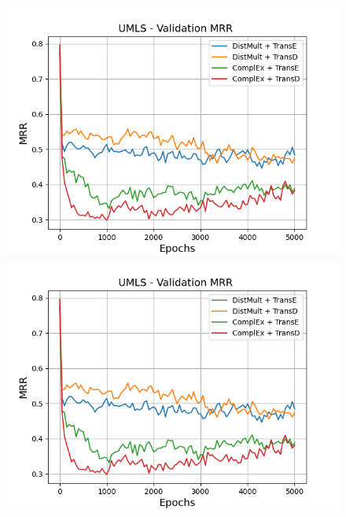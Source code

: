 \begin{figure}
    \centering
    \begin{minipage}{.5\textwidth}
      \centering
      \includegraphics[width=\linewidth]{figures/results/gan_train/pretrained/uncertainty/max/entropy/umls/5k_epochs/uncertainty_umls_mrrs.png}
    \end{minipage}%
    \begin{minipage}{.5\textwidth}
      \centering
      \includegraphics[width=\linewidth]{figures/results/gan_train/pretrained/uncertainty/max/entropy/umls/5k_epochs/uncertainty_umls_mrrs.png}
    \end{minipage}
    

\end{figure}

